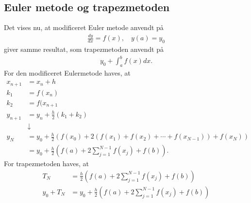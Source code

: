 \subsection*{Euler metode og trapezmetoden}
%
Det vises nu, at modificeret Euler metode anvendt på
\begin{align*}
\frac{dy}{dx}=f(x),\phantom{hi}y(a)=y_0
\end{align*}
%
giver samme resultat, som trapezmetoden anvendt på
%
\begin{align*}
y_0 + \int_a^b f(x) dx.
\end{align*}
%
For den modificeret Eulermetode haves, at
%
\begin{align*}
x_{n+1} &= x_n + h\\
k_1 &= f(x_n)\\
k_2 &= f(x_{n+1}\\
y_{n+1} &= y_n + \frac{h}{2}(k_1 + k_2)\\
&\downarrow\\
y_N &= y_0 + \frac{h}{2}\left( f(x_0) + 2(f(x_1) + f(x_2) + \cdots + f(x_{N-1})) + f(x_N) \right)\\
 &= y_0 + \frac{h}{2}\left(f(a) + 2\sum_{j=1}^{N-1}f(x_j) + f(b)\right).
\end{align*}
%
For trapezmetoden haves, at
%
\begin{align*}
T_N &= \frac{h}{2} \left(f(a) + 2\sum_{j=1}^{N-1} f(x_j) + f(b) \right)\\
y_0 + T_N  &= y_0 + \frac{h}{2} \left(f(a) + 2\sum_{j=1}^{N-1} f(x_j) + f(b) \right)
\end{align*}